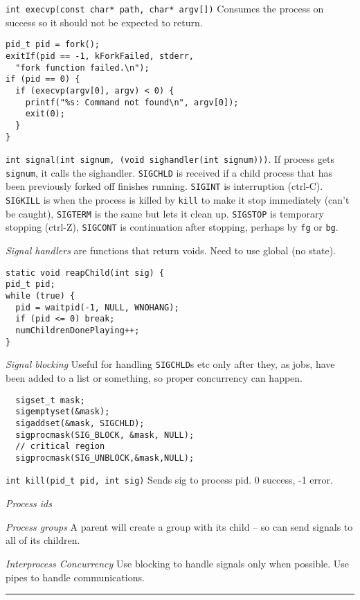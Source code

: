 \documentclass{article}
\begin{document}
\begin{multicols}{2}
  {\tt int execvp(const char* path, char* argv[])} Consumes the process on
  success so it should not be expected to return.
\begin{verbatim}
pid_t pid = fork();
exitIf(pid == -1, kForkFailed, stderr,
  "fork function failed.\n");
if (pid == 0) {
  if (execvp(argv[0], argv) < 0) {
    printf("%s: Command not found\n", argv[0]);
    exit(0);
  }
}\end{verbatim}

  {\tt int signal(int signum, (void sighandler(int signum)))}. If process gets
  {\tt signum}, it calls the sighandler. \texttt{SIGCHLD} is received if a child
  process that has been previously forked off finishes running. \texttt{SIGINT}
  is interruption (ctrl-C). \texttt{SIGKILL} is when the process is killed by
  \texttt{kill} to make it stop immediately (can't be caught), \texttt{SIGTERM}
  is the same but lets it clean up. \texttt{SIGSTOP} is temporary stopping
  (ctrl-Z), \texttt{SIGCONT} is continuation after stopping, perhaps by
  \texttt{fg} or \texttt{bg}.

  {\it Signal handlers} are functions that return voids. Need to use global (no
  state).
  \begin{verbatim}
static void reapChild(int sig) {
pid_t pid;
while (true) {
  pid = waitpid(-1, NULL, WNOHANG);
  if (pid <= 0) break;
  numChildrenDonePlaying++;
} \end{verbatim}
  {\it Signal blocking} Useful for handling \texttt{SIGCHLD}s etc only after they, as
  jobs, have been added to a list or something, so proper concurrency can
  happen.
  \begin{verbatim}
  sigset_t mask;
  sigemptyset(&mask);
  sigaddset(&mask, SIGCHLD);
  sigprocmask(SIG_BLOCK, &mask, NULL);
  // critical region
  sigprocmask(SIG_UNBLOCK,&mask,NULL);\end{verbatim}

  {\tt int kill(pid\_t pid, int sig)} Sends sig to process pid. 0 success, -1
  error.

  {\it Process ids} %

  {\it Process groups} A parent will create a group with its child -- so can
  send signals to all of its children.

  {\it Interprocess Concurrency} Use blocking to handle signals only when
  possible. Use pipes to handle communications.

  \noindent\rule{4cm}{0.4pt}


\end{multicols}
\end{document}
